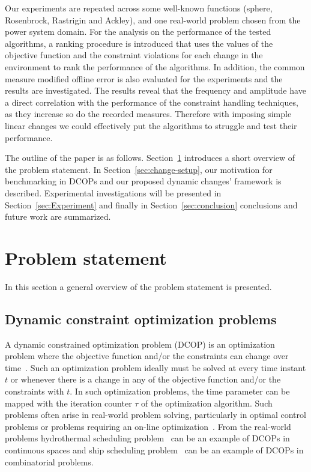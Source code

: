 \documentclass[review]{elsarticle}
\begin{document}
Our experiments are repeated across some well-known functions (sphere, Rosenbrock, Rastrigin and Ackley), and one real-world problem chosen from the power system domain. 
For the analysis on the performance of the tested algorithms, a ranking procedure is introduced that uses the values of the objective function and the constraint violations for each change in the environment to rank the performance of the algorithms. In addition, the common measure modified offline error is also evaluated for the experiments and the results are investigated.
The results reveal that the frequency and amplitude have a direct correlation with the performance of the constraint handling techniques, as they increase so do the recorded measures. Therefore with imposing simple linear changes we could effectively put the algorithms to struggle and test their performance.

The outline of the paper is as follows. Section~\ref{sec:Prim} introduces a short overview of the problem statement. In Section~\ref{sec:change-setup}, our motivation for benchmarking in DCOPs and our proposed dynamic changes' framework is described. Experimental investigations will be presented in Section~\ref{sec:Experiment} and finally in Section~\ref{sec:conclusion} conclusions and future work are summarized.

\section{Problem statement}
\label{sec:Prim}
In this section a general overview of the problem statement is presented.
\subsection{Dynamic constraint optimization problems}
A dynamic constrained optimization problem (DCOP) is an optimization problem where the objective function and/or the constraints can change over time~\citep{Nguyen20121}. Such an optimization problem ideally must be solved at every time instant $t$ or whenever there is a change in any of the objective function and/or the constraints with $t$. In such optimization problems, the time parameter can be mapped with the iteration counter $\tau$ of the optimization algorithm. Such problems often arise in real-world problem solving, particularly in optimal control problems or problems requiring an on-line optimization~\citep{de2008plant}. From the real-world problems hydrothermal scheduling problem~\citep{zhang2018multi} can be an example of DCOPs in continuous spaces and ship scheduling problem~\citep{Mertens_2006} can be an example of DCOPs in combinatorial problems.
\end{document}
